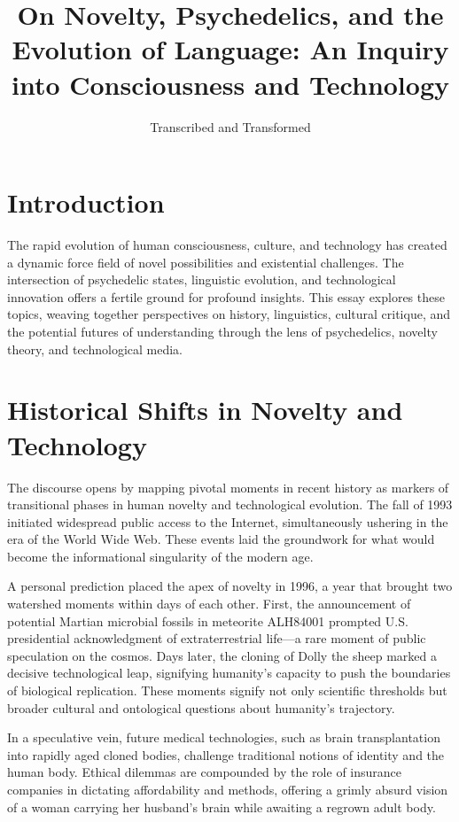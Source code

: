 \documentclass[12pt]{article}
\title{\textbf{On Novelty, Psychedelics, and the Evolution of Language: An Inquiry into Consciousness and Technology}}
\author{Transcribed and Transformed}
\date{}
\begin{document}
\maketitle

\section*{Introduction}

The rapid evolution of human consciousness, culture, and technology has created a dynamic force field of novel possibilities and existential challenges. The intersection of psychedelic states, linguistic evolution, and technological innovation offers a fertile ground for profound insights. This essay explores these topics, weaving together perspectives on history, linguistics, cultural critique, and the potential futures of understanding through the lens of psychedelics, novelty theory, and technological media.

\section*{Historical Shifts in Novelty and Technology}

The discourse opens by mapping pivotal moments in recent history as markers of transitional phases in human novelty and technological evolution. The fall of 1993 initiated widespread public access to the Internet, simultaneously ushering in the era of the World Wide Web. These events laid the groundwork for what would become the informational singularity of the modern age.

A personal prediction placed the apex of novelty in 1996, a year that brought two watershed moments within days of each other. First, the announcement of potential Martian microbial fossils in meteorite ALH84001 prompted U.S. presidential acknowledgment of extraterrestrial life—a rare moment of public speculation on the cosmos. Days later, the cloning of Dolly the sheep marked a decisive technological leap, signifying humanity's capacity to push the boundaries of biological replication. These moments signify not only scientific thresholds but broader cultural and ontological questions about humanity's trajectory.

In a speculative vein, future medical technologies, such as brain transplantation into rapidly aged cloned bodies, challenge traditional notions of identity and the human body. Ethical dilemmas are compounded by the role of insurance companies in dictating affordability and methods, offering a grimly absurd vision of a woman carrying her husband's brain while awaiting a regrown adult body.
\end{document}

